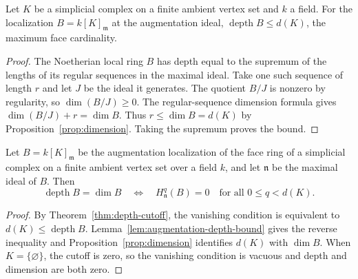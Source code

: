 \begin{lemma}\label{lem:augmentation-depth-bound}
Let $K$ be a simplicial complex on a finite ambient vertex set and $k$ a
field. For the localization $B=k[K]_{\mathfrak m}$ at the augmentation
ideal, $\operatorname{depth} B\le d(K)$, the maximum face cardinality.
\leanok
\end{lemma}
\begin{proof}
\leanok
The Noetherian local ring $B$ has depth equal to the supremum of the
lengths of its regular sequences in the maximal ideal. Take one such
sequence of length $r$ and let $J$ be the ideal it generates.
The quotient $B/J$ is nonzero by regularity, so $\dim(B/J)\ge 0$.
The regular-sequence dimension formula gives $\dim(B/J)+r=\dim B$.
Thus $r\le \dim B=d(K)$ by Proposition~\ref{prop:dimension}.
Taking the supremum proves the bound.
\end{proof}

\begin{corollary}\label{cor:augmentation-local-cm}
Let $B=k[K]_{\mathfrak m}$ be the augmentation localization of the face
ring of a simplicial complex on a finite ambient vertex set over a field
$k$, and let $\mathfrak n$ be the maximal ideal of $B$. Then
\[
  \operatorname{depth}B=\dim B
  \quad\Longleftrightarrow\quad
  H^q_{\mathfrak n}(B)=0\quad\text{for all }0\le q<d(K).
\]
\leanok
\end{corollary}
\begin{proof}
\leanok
By Theorem~\ref{thm:depth-cutoff}, the vanishing condition is equivalent
to $d(K)\le\operatorname{depth}B$. Lemma~\ref{lem:augmentation-depth-bound}
gives the reverse inequality and Proposition~\ref{prop:dimension}
identifies $d(K)$ with $\dim B$. When $K=\{\varnothing\}$, the cutoff
is zero, so the vanishing condition is vacuous and depth and dimension
are both zero.
\end{proof}

